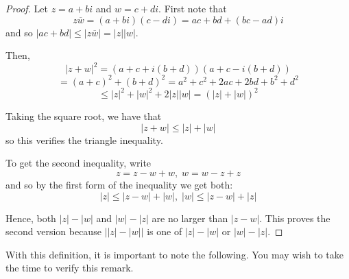 \begin{proof}
Let $z=a+bi$ and $w=c+di$. First note that
\begin{equation*}
z
\overline{w}=\left( a+bi\right) \left( c-di\right) =ac+bd+\left(
bc-ad\right)i
\end{equation*}
and so $\left\vert ac+bd\right\vert \leq \left\vert z\overline{w}\right\vert
=\left\vert z\right\vert \left\vert w\right\vert .$

Then,
\begin{equation*}
\left\vert z+w\right\vert ^{2}=\left( a+c+i\left( b+d\right) \right) \left(
a+c-i\left( b+d\right) \right)
\end{equation*}
\begin{equation*}
=\left( a+c\right) ^{2}+\left( b+d\right)
^{2}=a^{2}+c^{2}+2ac+2bd+b^{2}+d^{2}
\end{equation*}
\begin{equation*}
\leq \left\vert z\right\vert ^{2}+\left\vert w\right\vert ^{2}+2\left\vert
z\right\vert \left\vert w\right\vert =\left( \left\vert z\right\vert
+\left\vert w\right\vert \right) ^{2}
\end{equation*}

Taking the square root, we have that 
\begin{equation*}
\left\vert z+w\right\vert \leq \left\vert z\right\vert
+\left\vert w\right\vert 
\end{equation*}
so this verifies the triangle inequality. 

To get the  second inequality, write
\begin{equation*}
z=z-w+w,\;w=w-z+z
\end{equation*}
and so by the first form of the inequality we get both:
\begin{equation*}
\left\vert z\right\vert \leq \left\vert z-w\right\vert +\left\vert
w\right\vert ,\;\left\vert w\right\vert \leq \left\vert z-w\right\vert
+\left\vert z\right\vert
\end{equation*}

Hence,  both $\left\vert z\right\vert -\left\vert w\right\vert $ and 
$\left\vert w\right\vert -\left\vert z\right\vert $ are no larger than 
$\left\vert z-w\right\vert $. This proves the second version because 
$\left\vert \left\vert z\right\vert -\left\vert w\right\vert \right\vert $ is
one of $\left\vert z\right\vert -\left\vert w\right\vert $ or $\left\vert
w\right\vert -\left\vert z\right\vert $. 
\end{proof}

With this definition, it is important to note the following. You may wish to take
the time to verify this remark.

